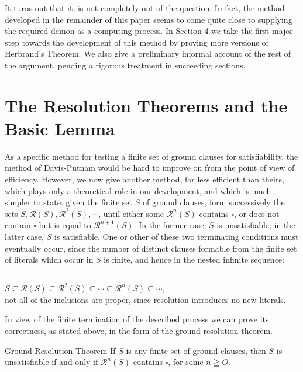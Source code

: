 \documentclass[8pt]{extarticle}
\begin{document}
It turns out that it, is not completely out of the question. In fact, the method developed in the remainder of this paper seems to come quite close to supplying the required demon as a computing process. In Section 4 we take the first major step towards the development of this method by proving more versions of Herbrand's Theorem. We also give a preliminary informal account of the rest of the argument, pending a rigorous treatment in succeeding sections.

\section{The Resolution Theorems and the Basic Lemma}

As a specific method for testing a finite set of ground clauses for satisfiability,
the method of Davis-Putnam \cite{davis_1960} would be hard to improve on from the point
of view of efficiency. However, we now give another method, far less efficient
than theirs, which plays only a theoretical role in our development, and which
is much simpler to state: given the finite set $S$ of ground clauses, form successively
the sets $S, \mathscr{R}(S), \mathscr{R}^2(S),\dotsm $, until either some $\mathscr{R}^n(S)$ contains $\square$, or does not
contain $\square$ but is equal to $\mathscr{R}^{n+1}(S)$. In the former case, $S$ is unsatisfiable; in the
latter case, $S$ is satisfiable. One or other of these two terminating conditions
must eventually occur, since the number of distinct clauses formable from the
finite set of literals which occur in $S$ is finite, and hence in the nested infinite
sequence:

\subsection{} $S \subseteq \mathscr{R}(S) \subseteq \mathscr{R}^2(S) \subseteq \dotsm \subseteq \mathscr{R}^n(S) \subseteq \dotsm$,\\not all of the inclusions are proper, since resolution introduces no new literals.

In view of the finite termination of the described process we can prove its
correctness, as stated above, in the form of the ground resolution theorem. 


\begin{grt}{Ground Resolution Theorem}\label{grt}
If $S$ is any finite set of ground clauses, then $S$ is unsatisfiable if and only if $\mathscr{R}^n(S)$ contains $\square$, for some $n\geqq O$. 
\end{grt}
\end{document}
